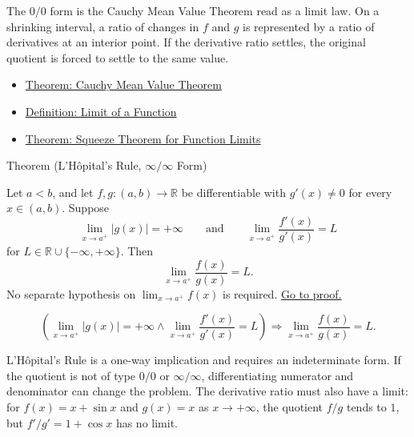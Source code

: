 \begin{remark*}[Interpretation]
The \(0/0\) form is the Cauchy Mean Value Theorem read as a limit law. On a shrinking interval, a ratio of changes in \(f\) and \(g\) is represented by a ratio of derivatives at an interior point. If the derivative ratio settles, the original quotient is forced to settle to the same value.
\end{remark*}

\begin{dependencies}
\begin{itemize}
  \item \hyperref[thm:cauchy-mean-value-theorem]{Theorem: Cauchy Mean Value Theorem}
  \item \hyperref[def:limit-function]{Definition: Limit of a Function}
  \item \hyperref[thm:squeeze-function-limits]{Theorem: Squeeze Theorem for Function Limits}
\end{itemize}
\end{dependencies}

\begin{theorembox}{Theorem (L'H\^{o}pital's Rule, \(\infty/\infty\) Form)}
\begin{theorem}
\label{thm:lhopital-infinity-over-infinity}
Let \(a<b\), and let \(f,g:(a,b)\to\mathbb{R}\) be differentiable with \(g'(x)\neq 0\) for every \(x\in(a,b)\). Suppose
\[
  \lim_{x\to a^+}|g(x)|=+\infty
  \qquad\text{and}\qquad
  \lim_{x\to a^+}\frac{f'(x)}{g'(x)}=L
\]
for \(L\in\mathbb{R}\cup\{-\infty,+\infty\}\). Then
\[
  \lim_{x\to a^+}\frac{f(x)}{g(x)}=L.
\]
No separate hypothesis on \(\lim_{x\to a^+}f(x)\) is required.
\hyperref[prf:lhopital-infinity-over-infinity]{Go to proof.}
\end{theorem}
\end{theorembox}

\begin{remark*}
\[
  \left(
  \lim_{x\to a^+}|g(x)|=+\infty
  \land
  \lim_{x\to a^+}\frac{f'(x)}{g'(x)}=L
  \right)
  \Longrightarrow
  \lim_{x\to a^+}\frac{f(x)}{g(x)}=L.
\]
\end{remark*}

\begin{remark*}
L'H\^{o}pital's Rule is a one-way implication and requires an indeterminate form. If the quotient is not of type \(0/0\) or \(\infty/\infty\), differentiating numerator and denominator can change the problem. The derivative ratio must also have a limit: for \(f(x)=x+\sin x\) and \(g(x)=x\) as \(x\to+\infty\), the quotient \(f/g\) tends to \(1\), but \(f'/g'=1+\cos x\) has no limit.
\end{remark*}

